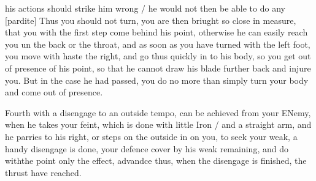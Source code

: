 \newpage


\newpage


his actions should strike him wrong / he would not then be able to do
any [pardite] Thus you should not turn, you are then briught so close
in measure, that you with the first step come behind his point,
otherwise he can easily reach you un the back or the throat, and as
soon as you have turned with the left foot, you move with haste the
right, and go thus quickly in to his body, so you get out of presence
of his point, so that he cannot draw his blade further back and injure
you. But in the case he had passed, you do no more than simply turn
your body and come out of presence.


Fourth with a disengage to an outside tempo, can be achieved from your ENemy, when he takes your feint, which is done with little Iron / and a straight arm, and he parries to his right, or steps on the outside in on you, to seek your weak, a handy disengage is done, your defence cover by his weak remaining, and do withthe point only the effect, advandce thus, when the disengage is finished, the thrust have reached.


